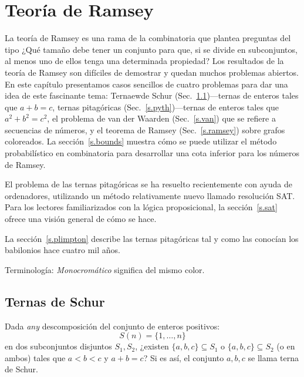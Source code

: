 
\chapter{Teoría de Ramsey}\label{c.ramsey}


La teoría de Ramsey es una rama de la combinatoria que plantea preguntas del tipo ¿Qué tamaño debe tener un conjunto para que, si se divide en subconjuntos, al menos uno de ellos tenga una determinada propiedad?
Los resultados de la teoría de Ramsey son difíciles de demostrar y quedan muchos problemas abiertos. En este capítulo presentamos casos sencillos de cuatro problemas para dar una idea de este fascinante tema: Ternaewde Schur (Sec.~\ref{s.schur})---ternas de enteros tales que $a+b=c$, ternas pitagóricas (Sec.~\ref{s.pyth})---ternas de enteros tales que $a^2+b^2=c^2$, el problema de van der Waarden (Sec.~\ref{s.van}) que se refiere a secuencias de números, y el teorema de Ramsey (Sec.~\ref{s.ramsey}) sobre grafos coloreados. La sección~\ref{s.bounds} muestra cómo se puede utilizar el método probabilístico en combinatoria para desarrollar una cota inferior para los números de Ramsey.

El problema de las ternas pitagóricas se ha resuelto recientemente con ayuda de ordenadores, utilizando un método relativamente nuevo llamado resolución SAT. Para los lectores familiarizados con la lógica proposicional, la sección~\ref{s.sat} ofrece una visión general de cómo se hace.

La sección~\ref{s.plimpton} describe las ternas pitagóricas tal y como las conocían los babilonios hace cuatro mil años.

Terminología: \emph{Monocromático} significa del mismo color.


\section{Ternas de Schur}\label{s.schur}

\begin{definition}
Dada \emph{any} descomposición del conjunto de enteros positivos:
\[
S(n)=\{1,\ldots,n\}
\]
en dos subconjuntos disjuntos $S_1,S_2$, ¿existen $\{a,b,c\}\subseteq S_1$ o $\{a,b,c\}\subseteq S_2$ (o en ambos) tales que $a\!<\!b\!<\!c$ y $a+b=c$? Si es así, el conjunto $ {a,b,c}$ se llama terna de Schur.
\end{definition}

